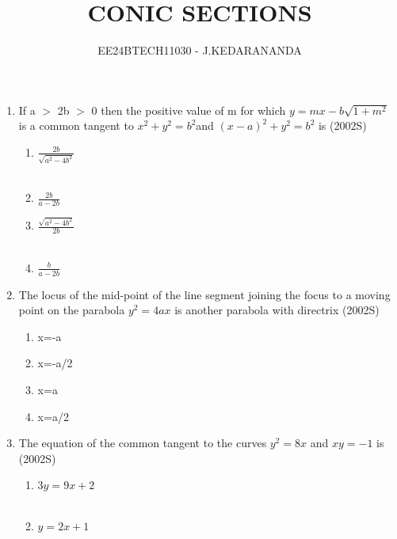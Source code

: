 \documentclass[journal,12pt,twocolumn]{IEEEtran}
\theoremstyle{remark}
\begin{document}

\vspace{3cm}

\title{CONIC SECTIONS}
\author{EE24BTECH11030 - J.KEDARANANDA}
\maketitle
\newpage
\bigskip

\renewcommand{\thefigure}{\theenumi}
\renewcommand{\thetable}{\theenumi}

\begin{enumerate}
\item If a $>$ 2b $>$ 0 then the positive value of m for which       $y=mx-b\sqrt{1+m^{2}} $ is a common tangent to $x^{2} + y^{2} = b^{2} $and  $(x-a)^{2} + y^{2} = b^{2}$ is   \hfill {(2002S)}
\begin{multicols}{2}
\begin{enumerate}
    \item $\frac{2b}{\sqrt{a^{2}-4b^{2}}}$\\\\
    \item $\frac{2b}{a-2b}$
    \item $\frac{\sqrt{a^{2}-4b^{2}}}{2b}$\\\\
    \item $\frac{b}{a-2b}$
\end{enumerate} 
\end{multicols}
\item The locus of the mid-point of the line segment joining the focus to a moving point on the parabola $y^{2} = 4ax$ is another parabola with directrix \hfill{(2002S)}
\begin{multicols}{4}
 \begin{enumerate}
    \item x=-a
    \item x=-a/2
    \item x=a
    \item x=a/2
 \end{enumerate}
\end{multicols}
\item The equation of the common tangent to the curves $y^{2}=8x$ and $xy=-1$ is \hfill{(2002S)}
\begin{multicols}{2}
\begin{enumerate}
    \item $3y=9x+2$\\\\
    \item $y=2x+1$

\end{enumerate}
\end{multicols}
\end{enumerate}
\end{document}
